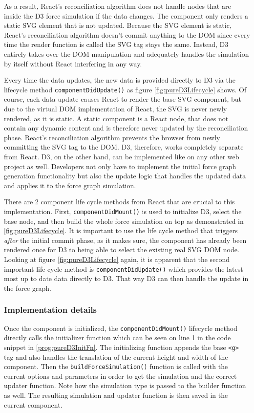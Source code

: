 As a result, React's reconciliation algorithm does not handle nodes that are inside the D3 force simulation if the data changes. The component only renders a static SVG element that is not updated. Because the SVG element is static, React's reconciliation algorithm doesn't commit anything to the DOM since every time the render function is called the SVG tag stays the same. Instead, D3 entirely takes over the DOM manipulation and adequately handles the simulation by itself without React interfering in any way.

Every time the data updates, the new data is provided directly to D3 via the lifecycle method \texttt{componentDidUpdate()} as figure \ref{fig:pureD3Lifecycle} shows. Of course, each data update causes React to render the base SVG component, but due to the virtual DOM implementation of React, the SVG is never newly rendered, as it is static. A static component is a React node, that does not contain any dynamic content and is therefore never updated by the reconciliation phase. React's reconciliation algorithm prevents the browser from newly committing the SVG tag to the DOM. D3, therefore, works completely separate from React. D3, on the other hand, can be implemented like on any other web project as well. Developers not only have to implement the initial force graph generation functionality but also the update logic that handles the updated data and applies it to the force graph simulation.

There are 2 component life cycle methods from React that are crucial to this implementation. First, \texttt{componentDidMount()} is used to initialize D3, select the base node, and then build the whole force simulation on top as demonstrated in \ref{fig:pureD3Lifecycle}. It is important to use the life cycle method that triggers \emph{after} the initial commit phase, as it makes sure, the component has already been rendered once for D3 to being able to select the existing real SVG DOM node. Looking at figure \ref{fig:pureD3Lifecycle} again, it is apparent that the second important life cycle method is \texttt{componentDidUpdate()} which provides the latest most up to date data directly to D3. That way D3 can then handle the update in the force graph.

\subsubsection{Implementation details}

Once the component is initialized, the \texttt{componentDidMount()} lifecycle method directly calls the initializer function which can be seen on line 1 in the code snippet in \ref{prog:pureD3InitFn}. The initializing function appends the base \texttt{<g>} tag and also handles the translation of the current height and width of the component. Then the \texttt{buildForceSimulation()} function is called with the current options and parameters in order to get the simulation and the correct updater function. Note how the simulation type is passed to the builder function as well. The resulting simulation and updater function is then saved in the current component.

